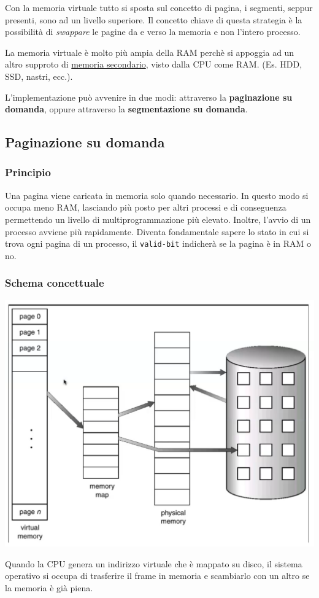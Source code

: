 \documentclass[a4paper,12pt, twoside]{report}
\newcommand{\defbox}[1]{\noindent\colorbox{shadecolor}
{\parbox{\dimexpr\textwidth-2\fboxsep\relax}{#1}}}
\begin{document}
Con la memoria virtuale tutto si sposta sul concetto di pagina, i segmenti, seppur presenti, sono ad un 
livello superiore. Il concetto chiave di questa strategia \`e la possibilit\`a di \emph{swappare} le 
pagine da e verso la memoria e non l'intero processo.

La memoria virtuale \`e molto pi\`u ampia della RAM perch\`e si appoggia ad un altro supproto di \underline{memoria secondario}, visto dalla CPU come RAM. (Es. HDD, SSD, nastri, ecc.). 

L'implementazione pu\`o avvenire in due modi: attraverso la \textbf{paginazione su domanda}, oppure 
attraverso la \textbf{segmentazione su domanda}. 


\subsection{Paginazione su domanda}

\subsubsection{Principio}
\defbox{Una pagina viene caricata in memoria solo quando necessario.
In questo modo si occupa meno RAM, lasciando pi\`u posto per altri processi e di conseguenza permettendo 
un livello di multiprogrammazione pi\`u elevato. Inoltre, l'avvio di un processo avviene pi\`u rapidamente. Diventa fondamentale sapere lo stato in cui si trova ogni pagina di un processo, il \texttt{valid-bit} 
indicher\`a se la pagina \`e in RAM o no.}

\subsubsection{Schema concettuale} 

\begin{center}
    \includegraphics[scale=0.2]{concept_virtmem}
\end{center}
Quando la CPU genera un indirizzo virtuale che \`e mappato su disco, il sistema operativo si occupa di 
trasferire il frame in memoria e scambiarlo con un altro se la memoria \`e gi\`a piena. 
\end{document}
